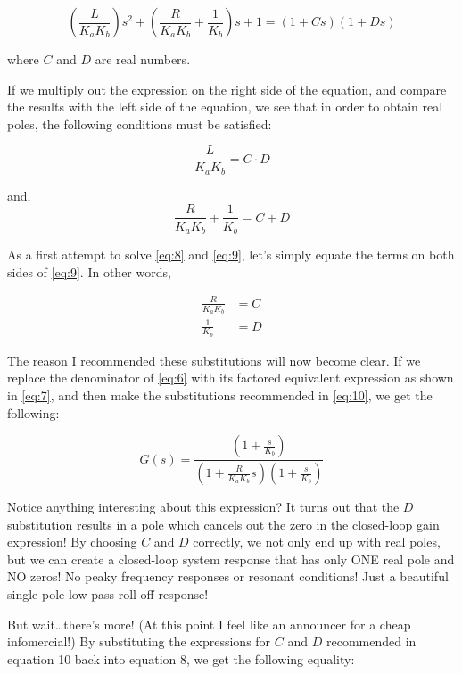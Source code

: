 \begin{equation}\label{eq:7}
    \left(\frac{L}{K_aK_b}\right)s^2 + \left(\frac{R}{K_aK_b}+\frac{1}{K_b}\right)s + 1 = \left(1+Cs\right)\left(1+Ds\right)
\end{equation}

where $C$ and $D$ are real numbers.

If we multiply out the expression on the right side of the equation, and compare the results with the left side of the equation, we see that in order to obtain real poles, the following conditions must be satisfied:

\begin{equation}\label{eq:8}
    \frac{L}{K_aK_b} = C\cdot D
\end{equation}

and,
\begin{equation}\label{eq:9}
    \frac{R}{K_aK_b} + \frac{1}{K_b} = C + D
\end{equation}

As a first attempt to solve \ref{eq:8} and \ref{eq:9}, let’s simply equate the terms on both sides of \ref{eq:9}. In other words,

\begin{align*}
    \frac{R}{K_aK_b} &= C \\
    \frac{1}{K_b} &= D \tag{Equ. 10}\label{eq:10}
\end{align*}

The reason I recommended these substitutions will now become clear.  If we replace the denominator of \ref{eq:6} with its factored equivalent expression as shown in \ref{eq:7}, and then make the substitutions recommended in \ref{eq:10}, we get the following:

\begin{equation}\label{eq:11}
    G(s) = \frac{\left(1+\frac{s}{K_b}\right)}{\left(1+\frac{R}{K_aK_b}s\right)\left(1+\frac{s}{K_b}\right)}
\end{equation}

Notice anything interesting about this expression?  It turns out that the $D$ substitution results in a pole which cancels out the zero in the closed-loop gain expression!  By choosing $C$ and $D$ correctly, we not only end up with real poles, but we can create a closed-loop system response that has only ONE real pole and NO zeros!  No peaky frequency responses or resonant conditions!  Just a beautiful single-pole low-pass roll off response!

But wait…there’s more!  (At this point I feel like an announcer for a cheap infomercial!)  By substituting the expressions for $C$ and $D$ recommended in equation 10 back into equation 8, we get the following equality:

